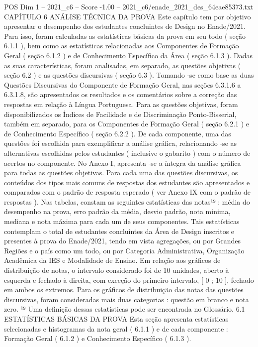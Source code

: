 \begin{textsample}{POS Dim 1 – 2021\_c6 – Score -1.00 – 2021\_c6/enade\_2021\_des\_64eae85373.txt}  \label{ex:f1_pos_203}
CAPÍTULO 6 ANÁLISE TÉCNICA DA PROVA Este capítulo tem por objetivo apresentar o desempenho dos estudantes concluintes de Design no Enade/2021.
Para isso, foram calculadas as estatísticas básicas da prova em seu todo ( seção 6.1.1 ), bem como as estatísticas relacionadas aos Componentes de Formação Geral ( seção 6.1.2 ) e de Conhecimento Específico da Área ( seção 6.1.3 ).
Dadas as suas características, foram analisadas, em separado, as questões objetivas ( seção 6.2 ) e as questões discursivas ( seção 6.3 ).
Tomando -se como base as duas Questões Discursivas do Componente de Formação Geral, nas seções 6.3.1.6 a 6.3.1.8, são apresentados os resultados e os comentários sobre a correção das respostas em relação à Língua Portuguesa.
Para as questões objetivas, foram disponibilizados os Índices de Facilidade e de Discriminação Ponto-Bisserial, também em separado, para os Componentes de Formação Geral ( seção 6.2.1 ) e de Conhecimento Específico ( seção 6.2.2 ).
De cada componente, uma das questões foi escolhida para exemplificar a análise gráfica, relacionando -se as alternativas escolhidas pelos estudantes ( inclusive o gabarito ) com o número de acertos no componente.
No Anexo I, apresenta -se a íntegra da análise gráfica para todas as questões objetivas.
Para cada uma das questões discursivas, os conteúdos dos tipos mais comuns de respostas dos estudantes são apresentados e comparados com o padrão de resposta esperado ( ver Anexo IX com o padrão de respostas ).
Nas tabelas, constam as seguintes estatísticas das notas¹⁹ : média do desempenho na prova, erro padrão da média, desvio padrão, nota mínima, mediana e nota máxima para cada um de seus componentes.
Tais estatísticas contemplam o total de estudantes concluintes da Área de Design inscritos e presentes à prova do Enade/2021, tendo em vista agregações, ou por Grandes Regiões e o país como um todo, ou por Categoria Administrativa, Organização Acadêmica da IES e Modalidade de Ensino.
Em relação aos gráficos de distribuição de notas, o intervalo considerado foi de 10 unidades, aberto à esquerda e fechado à direita, com exceção do primeiro intervalo, [ 0 ; 10 ], fechado em ambos os extremos.
Para os gráficos de distribuição das notas das questões discursivas, foram consideradas mais duas categorias : questão em branco e nota zero. ¹⁹ Uma definição dessas estatísticas pode ser encontrada no Glossário. 6.1 ESTATÍSTICAS BÁSICAS DA PROVA Esta seção apresenta estatísticas selecionadas e histogramas da nota geral ( 6.1.1 ) e de cada componente : Formação Geral ( 6.1.2 ) e Conhecimento Específico ( 6.1.3 ).

\end{textsample}
